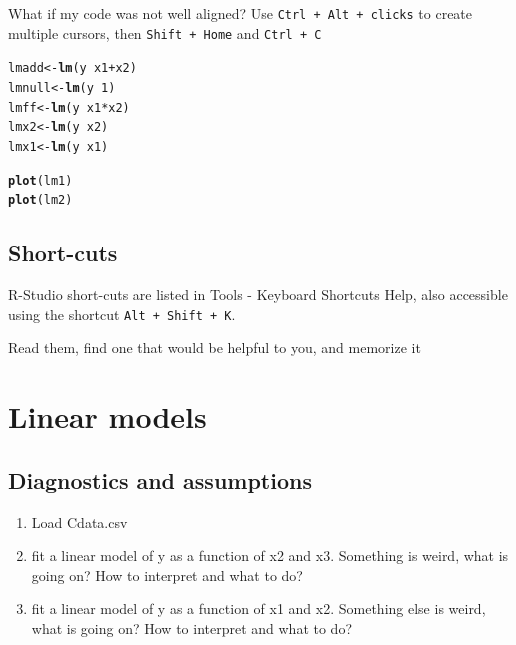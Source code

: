 \documentclass[12pt,a4paper]{scrartcl}\usepackage[]{graphicx}\usepackage[]{color}
\makeatletter
\newcommand{\hlnum}[1]{\textcolor[rgb]{0.686,0.059,0.569}{#1}}%
\newcommand{\hlopt}[1]{\textcolor[rgb]{0,0,0}{#1}}%
\newcommand{\hlstd}[1]{\textcolor[rgb]{0.345,0.345,0.345}{#1}}%
\newcommand{\hlkwb}[1]{\textcolor[rgb]{0.69,0.353,0.396}{#1}}%
\newcommand{\hlkwd}[1]{\textcolor[rgb]{0.737,0.353,0.396}{\textbf{#1}}}%
\newenvironment{kframe}{%
 \def\at@end@of@kframe{}%
 \ifinner\ifhmode%
  \def\at@end@of@kframe{\end{minipage}}%
  \begin{minipage}{\columnwidth}%
 \fi\fi%
 \def\FrameCommand##1{\hskip\@totalleftmargin \hskip-\fboxsep
 \colorbox{shadecolor}{##1}\hskip-\fboxsep
     \hskip-\linewidth \hskip-\@totalleftmargin \hskip\columnwidth}%
 \MakeFramed {\advance\hsize-\width
   \@totalleftmargin\z@ \linewidth\hsize
   \@setminipage}}%
 {\par\unskip\endMakeFramed%
 \at@end@of@kframe}
\newenvironment{knitrout}{}{} %
\makeatother
\begin{document}
 \begin{Exercise}[difficulty=2]
 What if my code was not well aligned? 
Use \texttt{Ctrl + Alt + clicks} to create multiple cursors, then \texttt{Shift + Home} and \texttt{Ctrl + C}
\begin{knitrout}
\color{fgcolor}\begin{kframe}
\begin{alltt}
\hlstd{lmadd} \hlkwb{<-} \hlkwd{lm}\hlstd{(y} \hlopt{~} \hlstd{x1} \hlopt{+} \hlstd{x2)}
\hlstd{lmnull} \hlkwb{<-} \hlkwd{lm}\hlstd{(y} \hlopt{~} \hlnum{1}\hlstd{)}
\hlstd{lmff} \hlkwb{<-} \hlkwd{lm}\hlstd{(y} \hlopt{~} \hlstd{x1}\hlopt{*}\hlstd{x2)}
\hlstd{lmx2}\hlkwb{<-} \hlkwd{lm}\hlstd{(y} \hlopt{~} \hlstd{x2)}
\hlstd{lmx1}  \hlkwb{<-} \hlkwd{lm}\hlstd{(y} \hlopt{~} \hlstd{x1)}


\hlkwd{plot}\hlstd{(lm1)}
\hlkwd{plot}\hlstd{(lm2)}
\end{alltt}
\end{kframe}
\end{knitrout}
 \end{Exercise}

\subsection{Short-cuts}

R-Studio short-cuts are listed in Tools - Keyboard Shortcuts Help, also accessible using the shortcut \texttt{Alt + Shift + K}.

\begin{Exercise}[difficulty=1]
Read them, find one that would be helpful to you, and memorize it
\end{Exercise}

\section{Linear models}

\subsection{Diagnostics and assumptions}
\begin{Exercise}[difficulty=2]
\begin{enumerate}
    \item Load Cdata.csv
    \item fit a linear model of y as a function of x2 and x3. Something is weird, what is going on? How to interpret and what to do?
    \item fit a linear model of y as a function of x1 and x2. Something else is weird, what is going on? How to interpret and what to do?
  \end{enumerate}
\end{Exercise}
\end{document}
